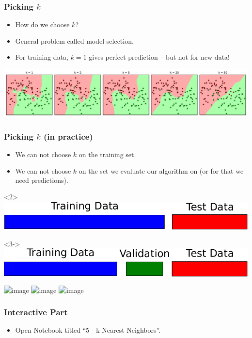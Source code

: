 \begin{frame}
    \frametitle{Picking $k$}
    \begin{itemize}
        \item How do we choose $k$?
        \item General problem called model selection.
        \item For training data, $k=1$ gives perfect prediction -- but not for new data!
    \end{itemize}
    \includegraphics[width=.98\linewidth]{knn-pics/two_moons_varying_k}
\end{frame}


\begin{frame}[t]
    \frametitle{Picking $k$ (in practice)}
    \begin{itemize}
        \item We can not choose $k$ on the training set.
        \item We can not choose $k$ on the set we evaluate our algorithm on (or
            for that we need predictions).
    \end{itemize}
    \center
        \begin{onlyenv}<2>
            \includegraphics[width=.7\linewidth]{knn-pics/train_test_bars-crop}\\
        \end{onlyenv}
        \begin{onlyenv}<3->
            \includegraphics[width=.7\linewidth]{knn-pics/train_val_test_bars-crop}\\
        \end{onlyenv}

    \includegraphics<4>[width=.7\linewidth]{knn-pics/two_moons_cross_validation_1}
    \includegraphics<5>[width=.7\linewidth]{knn-pics/two_moons_cross_validation_2}
    \includegraphics<6>[width=.7\linewidth]{knn-pics/two_moons_cross_validation_3}

\end{frame}

\begin{frame}
  \frametitle{Interactive Part}
  \begin{itemize}
      \item Open Notebook titled ``5 - k Nearest Neighbors''.
  \end{itemize}
\end{frame}
